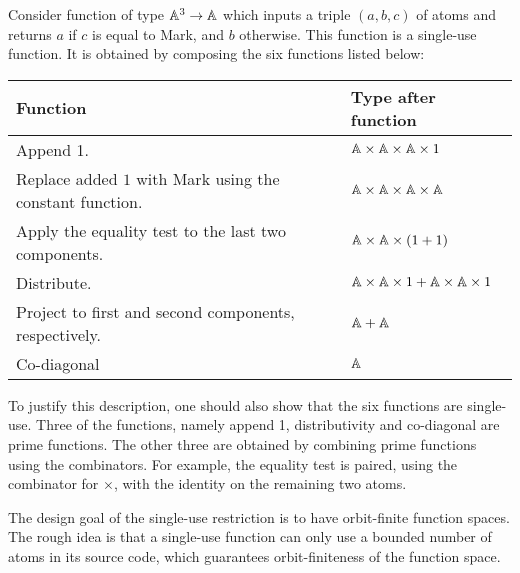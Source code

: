 \begin{example}\label{ex:six-compositions}
    Consider function of type $\mathbb A^3 \to \mathbb A$ which inputs a triple $(a,b,c)$ of atoms and returns $a$ if $c$ is equal to Mark, and $b$ otherwise. This function is a single-use function. It is obtained by composing the six functions listed below:
\begin{center}
    \begin{tabular}{ll}
        Function & Type after function \\
        \hline
        Append 1. & $ \mathbb A \times \mathbb A \times \mathbb A \times 1$ \\
        Replace added $1$ with Mark using the constant function. & $\mathbb A \times \mathbb A \times \mathbb A \times \mathbb A$ \\
        Apply the equality test to the last two components. & $ \mathbb A \times \mathbb A \times (1+1)$ \\
        Distribute. & $ \mathbb A \times \mathbb A \times 1 +   \mathbb A \times \mathbb A \times 1$ \\
        Project to first and second components, respectively. & $\mathbb A + \mathbb A$ \\
        Co-diagonal & $\mathbb A$ 
    \end{tabular}
\end{center}
To justify this description, one should also show that the six functions are single-use. Three of the functions, namely append 1, distributivity and co-diagonal are prime functions. The other three are obtained by combining prime functions using the combinators. For example, the equality test is paired, using the combinator for $\times$, with the identity on the remaining two atoms. \exampleend
\end{example}

The design goal of the single-use restriction is to have orbit-finite function spaces. The rough idea is that a single-use function can only use a bounded number of atoms in its source code, which guarantees orbit-finiteness of the function space. 

